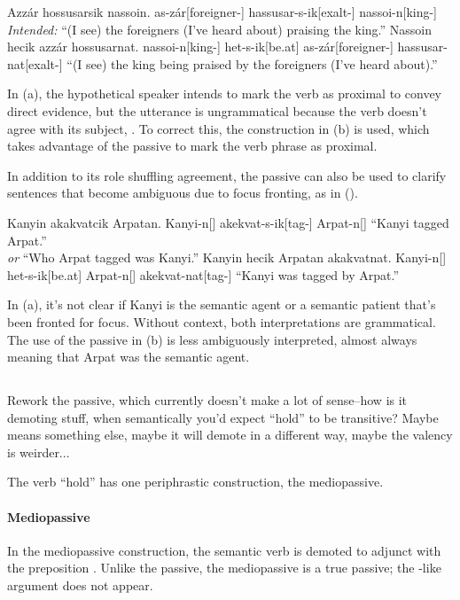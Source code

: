 \begin{gloss*}
	\a \ljudge{*} \begingl
		\glpreamble Azzár hossusarsik nassoin.\endpreamble 
			as-zár[foreigner-]
			hassusar-s-ik[exalt-]
			nassoi-n[king-]
		\glft \textit{Intended:} “(I see) the foreigners (I've heard about) praising the king.”
	\endgl
	\a \begingl
		\glpreamble Nassoin hecik azzár hossusarnat.\endpreamble
			nassoi-n[king-]
			het-s-ik[be.at]
			as-zár[foreigner-]
			hassusar-nat[exalt-]
		\glft “(I see) the king being praised by the foreigners (I've heard about).”
	\endgl
\end{gloss*}

In (\lastx a), the hypothetical speaker intends to mark the verb as proximal to convey direct evidence, but the utterance is ungrammatical because the verb doesn't agree with its subject, . To correct this, the construction in (\lastx b) is used, which takes advantage of the passive to mark the verb phrase as proximal.

\par In addition to its role shuffling agreement, the  passive can also be used to clarify sentences that become ambiguous due to focus fronting, as in (\nextx).

\begin{gloss*}
	\a \begingl
		\glpreamble Kanyin akakvatcik Arpatan. \endpreamble
			Kanyi-n[]
			akekvat-s-ik[tag-]
			Arpat-n[]
		\glft “Kanyi tagged Arpat.” \\ \textit{or} “Who Arpat tagged was Kanyi.”
	\endgl
	\a \begingl
		\glpreamble Kanyin hecik Arpatan akakvatnat. \endpreamble
			Kanyi-n[]
			het-s-ik[be.at]
			Arpat-n[]
			akekvat-nat[tag-]
		\glft “Kanyi was tagged by Arpat.”
	\endgl
\end{gloss*}

In (\lastx a), it's not clear if Kanyi is the semantic agent or a semantic patient that's been fronted for focus. Without context, both interpretations are grammatical. The use of the passive in (\lastx b) is less ambiguously interpreted, almost always meaning that Arpat was the semantic agent.

\subsection{}
\begin{kaobox}[frametitle=\sc todo:]
    Rework the  passive, which currently doesn't make a lot of sense--how is it demoting stuff, when semantically you'd expect “hold” to be transitive? Maybe  means something else, maybe it will demote in a different way, maybe the valency is weirder...
\end{kaobox}
The verb  “hold” has one periphrastic construction, the mediopassive. 

\paragraph{Mediopassive}
In the mediopassive construction, the semantic verb is demoted to adjunct with the preposition . Unlike the  passive, the  mediopassive is a true passive; the -like argument does not appear.
